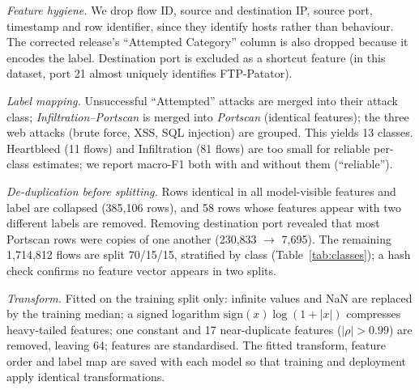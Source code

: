 \documentclass[conference]{IEEEtran}
\begin{document}
\textit{Feature hygiene.} We drop flow ID, source and destination IP, source port, timestamp and
row identifier, since they identify hosts rather than behaviour. The corrected release's
``Attempted Category'' column is also dropped because it encodes the label. Destination port is
excluded as a shortcut feature (in this dataset, port 21 almost uniquely identifies FTP-Patator).

\textit{Label mapping.} Unsuccessful ``Attempted'' attacks are merged into their attack class;
\textit{Infiltration--Portscan} is merged into \textit{Portscan} (identical features); the three
web attacks (brute force, XSS, SQL injection) are grouped. This yields 13 classes. Heartbleed
(11 flows) and Infiltration (81 flows) are too small for reliable per-class estimates; we report
macro-F1 both with and without them (``reliable'').

\textit{De-duplication before splitting.} Rows identical in all model-visible features and label
are collapsed (385,106 rows), and 58 rows whose features appear with two different labels are
removed. Removing destination port revealed that most Portscan rows were copies of one another
(230,833 $\rightarrow$ 7,695). The remaining 1,714,812 flows are split 70/15/15, stratified by
class (Table~\ref{tab:classes}); a hash check confirms no feature vector appears in two splits.

\textit{Transform.} Fitted on the training split only: infinite values and NaN are replaced by
the training median; a signed logarithm $\mathrm{sign}(x)\log(1+|x|)$ compresses heavy-tailed
features; one constant and 17 near-duplicate features ($|\rho|>0.99$) are removed, leaving 64;
features are standardised. The fitted transform, feature order and label map are saved with each
model so that training and deployment apply identical transformations.
\end{document}
